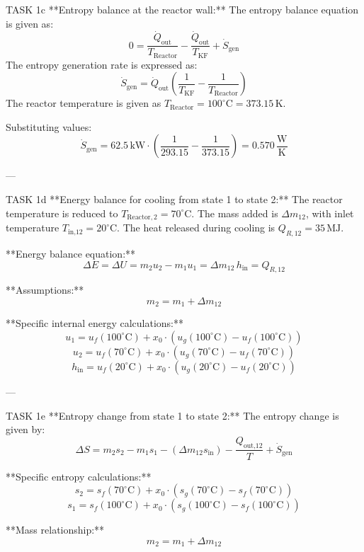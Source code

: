 TASK 1c  
**Entropy balance at the reactor wall:**  
The entropy balance equation is given as:  
\[
0 = \frac{\dot{Q}_{\text{out}}}{T_{\text{Reactor}}} - \frac{\dot{Q}_{\text{out}}}{T_{\text{KF}}} + \dot{S}_{\text{gen}}
\]  
The entropy generation rate is expressed as:  
\[
\dot{S}_{\text{gen}} = \dot{Q}_{\text{out}} \left( \frac{1}{T_{\text{KF}}} - \frac{1}{T_{\text{Reactor}}} \right)
\]  
The reactor temperature is given as \( T_{\text{Reactor}} = 100^\circ\text{C} = 373.15 \, \text{K} \).  

Substituting values:  
\[
\dot{S}_{\text{gen}} = 62.5 \, \text{kW} \cdot \left( \frac{1}{293.15} - \frac{1}{373.15} \right) = 0.570 \, \frac{\text{W}}{\text{K}}
\]  

---

TASK 1d  
**Energy balance for cooling from state 1 to state 2:**  
The reactor temperature is reduced to \( T_{\text{Reactor},2} = 70^\circ\text{C} \).  
The mass added is \( \Delta m_{12} \), with inlet temperature \( T_{\text{in,12}} = 20^\circ\text{C} \).  
The heat released during cooling is \( Q_{R,12} = 35 \, \text{MJ} \).  

**Energy balance equation:**  
\[
\Delta E = \Delta U = m_2 u_2 - m_1 u_1 = \Delta m_{12} \, h_{\text{in}} = Q_{R,12}
\]  

**Assumptions:**  
\[
m_2 = m_1 + \Delta m_{12}
\]  

**Specific internal energy calculations:**  
\[
u_1 = u_f(100^\circ\text{C}) + x_0 \cdot \left( u_g(100^\circ\text{C}) - u_f(100^\circ\text{C}) \right)
\]  
\[
u_2 = u_f(70^\circ\text{C}) + x_0 \cdot \left( u_g(70^\circ\text{C}) - u_f(70^\circ\text{C}) \right)
\]  
\[
h_{\text{in}} = u_f(20^\circ\text{C}) + x_0 \cdot \left( u_g(20^\circ\text{C}) - u_f(20^\circ\text{C}) \right)
\]  

---

TASK 1e  
**Entropy change from state 1 to state 2:**  
The entropy change is given by:  
\[
\Delta S = m_2 s_2 - m_1 s_1 - \left( \Delta m_{12} s_{\text{in}} \right) - \frac{Q_{\text{out,12}}}{T} + \dot{S}_{\text{gen}}
\]  

**Specific entropy calculations:**  
\[
s_2 = s_f(70^\circ\text{C}) + x_0 \cdot \left( s_g(70^\circ\text{C}) - s_f(70^\circ\text{C}) \right)
\]  
\[
s_1 = s_f(100^\circ\text{C}) + x_0 \cdot \left( s_g(100^\circ\text{C}) - s_f(100^\circ\text{C}) \right)
\]  

**Mass relationship:**  
\[
m_2 = m_1 + \Delta m_{12}
\]  